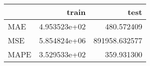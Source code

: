 \begin{tabular}{lrr}
\toprule
{} &         train &           test \\
\midrule
MAE  &  4.953523e+02 &     480.572409 \\
MSE  &  5.854824e+06 &  891958.632577 \\
MAPE &  3.529533e+02 &     359.931300 \\
\bottomrule
\end{tabular}

